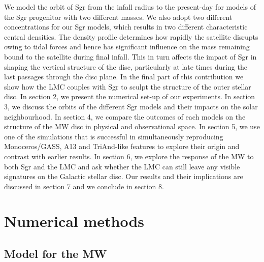 \documentclass[useAMS,usenatbib]{mnras}
\begin{document}
We model the orbit of Sgr from the infall radius to the present-day for models of the Sgr progenitor with two different masses. We also adopt two different concentrations for our Sgr models, which results in two different characteristic central densities. The density profile determines how rapidly the satellite disrupts owing to tidal forces \citep{penarrubia10b} and hence has significant influence on the mass remaining bound to the satellite during final infall. This in turn affects the impact of Sgr in shaping the vertical structure of the disc, particularly at late times during the last passages through the disc plane. In the final part of this contribution we show how the LMC couples with  Sgr to sculpt the structure of the outer stellar disc. In section 2, we present the numerical set-up of our experiments. In section 3, we discuss the orbits of the different Sgr models and their impacts on the solar neighbourhood. In section 4, we compare the outcomes of each models on the structure of the MW disc in physical and observational space. In section 5, we use one of the simulations that is successful in simultaneously reproducing Monoceros/GASS, A13 and TriAnd-like features to explore their origin and contrast with earlier results. In section 6, we explore the response of the MW to both Sgr and the LMC and ask whether the LMC can still leave any visible signatures on the Galactic stellar disc. Our results and their implications are discussed in section 7 and we conclude in section 8.


\section{Numerical methods}

\subsection{Model for the MW}
\end{document}
